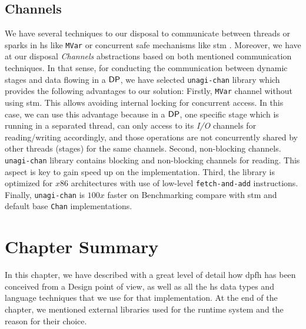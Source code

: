 \subsection{Channels\label{section:channels}} 
We have several techniques to our disposal to communicate between threads or sparks in \acrshort{hs} like \texttt{MVar} or concurrent safe mechanisms like \acrfull{stm} \cite{stm}. Moreover, we have at our disposal \textit{Channels} abstractions based on both mentioned communication techniques. In that sense, for conducting the communication between dynamic stages and data flowing in a $\mathsf{DP}$, we have selected \texttt{unagi-chan} library \cite{unagi} which provides the following advantages to our solution: Firstly,  \texttt{MVar} channel without using \acrshort{stm}. This allows avoiding internal locking for concurrent access. 
In this case, we can use this advantage because in a $\mathsf{DP}$, one specific stage which is running in a separated thread, can only access to its \textit{I/O} channels for reading/writing accordingly, and those operations are not concurrently shared by other threads (stages) for the same channels. Second,  non-blocking channels. \texttt{unagi-chan} library contains blocking and non-blocking channels for reading. This aspect is key to gain speed up on the implementation. Third, the library is optimized for $x86$ architectures with use of low-level \texttt{fetch-and-add} instructions. Finally, \texttt{unagi-chan} is $100x$ faster on Benchmarking compare with \acrshort{stm} and default base \texttt{Chan} implementations.

\section{Chapter Summary}
In this chapter, we have described with a great level of detail how \acrlong{dpfh} has been conceived from a Design point of view, 
as well as all the \acrshort{hs} data types and language techniques that we use for that implementation. 
At the end of the chapter, we mentioned external libraries used for the runtime system and the reason for their choice.
